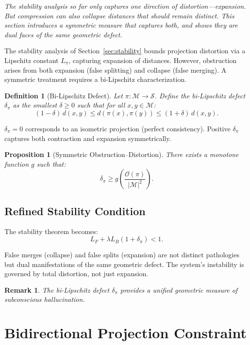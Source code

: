 \documentclass[12pt,a4paper]{article}
\newtheorem{proposition}[theorem]{Proposition}
\newtheorem{definition}[theorem]{Definition}
\newtheorem{remark}[theorem]{Remark}
\begin{document}
\textit{The stability analysis so far only captures one direction of distortion---expansion. But compression can also collapse distances that should remain distinct. This section introduces a symmetric measure that captures both, and shows they are dual faces of the same geometric defect.}

The stability analysis of Section~\ref{sec:stability} bounds projection distortion via a Lipschitz constant $L_\pi$, capturing expansion of distances. However, obstruction arises from both expansion (false splitting) and collapse (false merging). A symmetric treatment requires a bi-Lipschitz characterization.

\begin{definition}[Bi-Lipschitz Defect]
Let $\pi : \mathcal{M} \to \mathcal{S}$. Define the bi-Lipschitz defect $\delta_\pi$ as the smallest $\delta \geq 0$ such that for all $x,y \in \mathcal{M}$:
\[
(1-\delta)\, d(x,y) \leq d(\pi(x),\pi(y)) \leq (1+\delta)\, d(x,y).
\]
\end{definition}

$\delta_\pi = 0$ corresponds to an isometric projection (perfect consistency). Positive $\delta_\pi$ captures both contraction and expansion symmetrically.

\begin{proposition}[Symmetric Obstruction--Distortion]
There exists a monotone function $g$ such that:
\[
\delta_\pi \geq g\!\left(\frac{\mathcal{O}(\pi)}{|\mathcal{M}|^2}\right).
\]
\end{proposition}

\subsection{Refined Stability Condition}

The stability theorem becomes:
\[
L_F + \lambda L_B (1 + \delta_\pi) < 1.
\]

False merges (collapse) and false splits (expansion) are not distinct pathologies but dual manifestations of the same geometric defect. The system's instability is governed by total distortion, not just expansion.

\begin{remark}
The bi-Lipschitz defect $\delta_\pi$ provides a unified geometric measure of subconscious hallucination.
\end{remark}

\section{Bidirectional Projection Constraint}
\label{sec:bidirectional}
\end{document}
